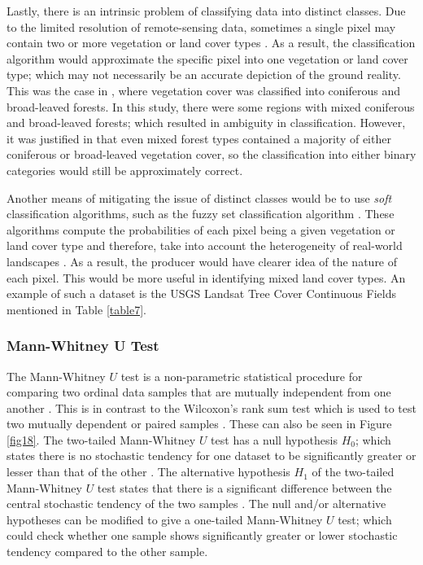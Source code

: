 \justify
Lastly, there is an intrinsic problem of classifying data into distinct classes. Due to the limited resolution of remote-sensing data, sometimes a single pixel may contain two or more vegetation or land cover types \citep{al2013image}. As a result, the classification algorithm would approximate the specific pixel into one vegetation or land cover type; which may not necessarily be an accurate depiction of the ground reality. This was the case in \citealt{puletti2016}, where vegetation cover was classified into coniferous and broad-leaved forests. In this study, there were some regions with mixed coniferous and broad-leaved forests; which resulted in ambiguity in classification. However, it was justified in \citealt{puletti2016} that even mixed forest types contained a majority of either coniferous or broad-leaved vegetation cover, so the classification into either binary categories would still be approximately correct. 

\justify
Another means of mitigating the issue of distinct classes would be to use \textit{soft} classification algorithms, such as the fuzzy set classification algorithm \citep{al2013image}. These algorithms compute the probabilities of each pixel being a given vegetation or land cover type and therefore, take into account the heterogeneity of real-world landscapes \citep{al2013image}. As a result, the producer would have clearer idea of the nature of each pixel. This would be more useful in identifying mixed land cover types. An example of such a dataset is the USGS Landsat Tree Cover Continuous Fields mentioned in Table \ref{table7}.

\subsubsection{Mann-Whitney U Test}

\justify
The Mann-Whitney $U$ test is a non-parametric statistical procedure for comparing two ordinal data samples that are mutually independent from one another \citep{corder2011}. This is in contrast to the Wilcoxon's rank sum test which is used to test two mutually dependent or paired samples \citep{corder2011}. These can also be seen in Figure \ref{fig18}. The two-tailed Mann-Whitney $U$ test has a null hypothesis $H_0$; which states there is no stochastic tendency for one dataset to be significantly greater or lesser than that of the other \citep{corder2011}. The alternative hypothesis $H_1$ of the two-tailed Mann-Whitney $U$ test states that there is a significant difference between the central stochastic tendency of the two samples \citep{corder2011}. The null and/or alternative hypotheses can be modified to give a one-tailed Mann-Whitney $U$ test; which could check whether one sample shows significantly greater or lower stochastic tendency compared to the other sample.

